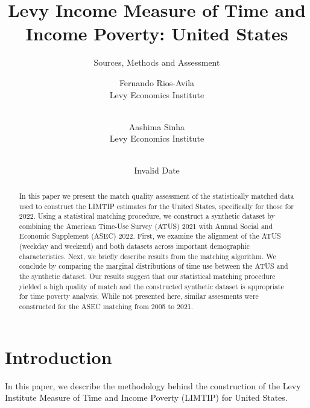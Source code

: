 \documentclass[
  11pt,
]{article}
\title{Levy Income Measure of Time and Income Poverty: United States}
\subtitle{Sources, Methods and Assessment}
\author{
Fernando Rios-Avila\\
Levy Economics Institute\\
\\
\and 
Aashima Sinha\\
Levy Economics Institute\\
\\
}
\date{Invalid Date}
\begin{document}
\def\spacingset#1{\renewcommand{\baselinestretch}%
{#1}\small\normalsize} \spacingset{1}


\maketitle
\begin{abstract}
In this paper we present the match quality assessment of the
statistically matched data used to construct the LIMTIP estimates for
the United States, specifically for those for 2022. Using a statistical
matching procedure, we construct a synthetic dataset by combining the
American Time-Use Survey (ATUS) 2021 with Annual Social and Economic
Supplement (ASEC) 2022. First, we examine the alignment of the ATUS
(weekday and weekend) and both datasets across important demographic
characteristics. Next, we briefly describe results from the matching
algorithm. We conclude by comparing the marginal distributions of time
use between the ATUS and the synthetic dataset. Our results suggest that
our statistical matching procedure yielded a high quality of match and
the constructed synthetic dataset is appropriate for time poverty
analysis. While not presented here, similar assesments were constructed
for the ASEC matching from 2005 to 2021.
\end{abstract}
 
\vspace{.2in}

\setcounter{tocdepth}{2}



\thispagestyle{empty}
\clearpage{}
\newpage
\spacingset{1.2} %
\section{Introduction}\label{introduction}

In this paper, we describe the methodology behind the construction of
the Levy Institute Measure of Time and Income Poverty (LIMTIP) for
United States.
\end{document}
